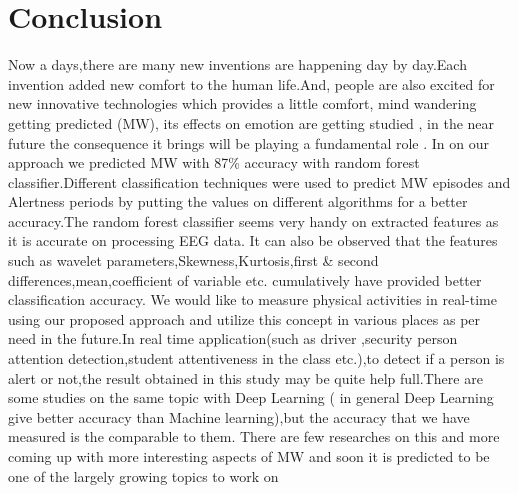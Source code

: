 
\chapter{Conclusion} %

\label{Chapter7} %


Now a days,there are many new inventions are happening day by day.Each invention added new comfort to the human life.And, people are also excited for new innovative technologies which provides a little comfort, mind wandering getting predicted  (MW), its effects on emotion are getting studied , in the near future the consequence it brings will be playing a fundamental role . In on our approach we predicted MW with 87\% accuracy with random forest classifier.Different classification techniques were used to predict MW episodes and Alertness periods by putting the values on different algorithms for a better accuracy.The  random forest classifier seems very handy on extracted features as it is accurate on processing EEG data. It can also be observed that the features such as wavelet parameters,Skewness,Kurtosis,first \& second differences,mean,coefficient of variable etc. cumulatively have provided better classification accuracy. We would like to measure physical activities in real-time using our proposed approach and utilize this concept in various places as per need in the future.In real time application(such as driver ,security person attention detection,student attentiveness in the class etc.),to detect if a person is alert or not,the result obtained in this study may be quite help full.There are some studies on the same topic with Deep Learning ( in general Deep Learning give better accuracy than Machine learning),but the accuracy that we have measured is the comparable to them. There are few researches on this and more coming up with more interesting aspects of MW and soon it is predicted to be one of the largely growing topics to work on